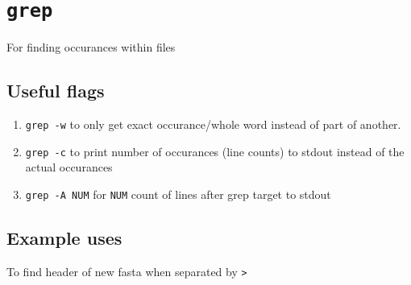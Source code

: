     
    
    

    
    \section{\texorpdfstring{\texttt{grep}}{grep}}\label{grep}

For finding occurances within files

    \subsection{Useful flags}\label{useful-flags}

\begin{enumerate}
\def\labelenumi{\arabic{enumi}.}
\item
  \texttt{grep\ -w} to only get exact occurance/whole word instead of
  part of another.
\item
  \texttt{grep\ -c} to print number of occurances (line counts) to
  stdout instead of the actual occurances
\item
  \texttt{grep\ -A\ NUM} for \texttt{NUM} count of lines after grep
  target to stdout
\end{enumerate}

    \subsection{Example uses}\label{example-uses}

    \begin{Shaded}
\begin{Highlighting}[]
\ExtensionTok{$}\KeywordTok{|}  \KeywordTok{|} 

\end{Highlighting}
\end{Shaded}

    \begin{Shaded}
\begin{Highlighting}[]
\ExtensionTok{$}\KeywordTok{|}  \KeywordTok{|}  

\end{Highlighting}
\end{Shaded}

    \begin{Shaded}
\begin{Highlighting}[]
\ExtensionTok{$} 
\end{Highlighting}
\end{Shaded}

To find header of new fasta when separated by \texttt{\textgreater{}}


    
    
    
